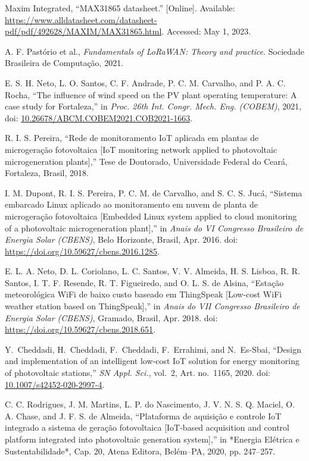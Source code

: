\documentclass{ieeeaccess}
\begin{document}
\begin{thebibliography}{00}
Maxim Integrated, “MAX31865 datasheet.” [Online]. Available: \url{https://www.alldatasheet.com/datasheet-pdf/pdf/492628/MAXIM/MAX31865.html}. Accessed: May 1, 2023.

A. F. Pastório et al., \emph{Fundamentals of LoRaWAN: Theory and practice}. Sociedade Brasileira de Computação, 2021.

E. S. H. Neto, L. O. Santos, C. F. Andrade, P. C. M. Carvalho, and P. A. C. Rocha, “The influence of wind speed on the PV plant operating temperature: A case study for Fortaleza,” in \emph{Proc. 26th Int. Congr. Mech. Eng. (COBEM)}, 2021, doi: \url{10.26678/ABCM.COBEM2021.COB2021-1663}.

R. I. S. Pereira, “Rede de monitoramento IoT aplicada em plantas de microgeração fotovoltaica [IoT monitoring network applied to photovoltaic microgeneration plants],” Tese de Doutorado, Universidade Federal do Ceará, Fortaleza, Brasil, 2018.

I. M. Dupont, R. I. S. Pereira, P. C. M. de Carvalho, and S. C. S. Jucá, “Sistema embarcado Linux aplicado ao monitoramento em nuvem de planta de microgeração fotovoltaica [Embedded Linux system applied to cloud monitoring of a photovoltaic microgeneration plant],” in \emph{Anais do VI Congresso Brasileiro de Energia Solar (CBENS)}, Belo Horizonte, Brasil, Apr. 2016. doi: \url{https://doi.org/10.59627/cbens.2016.1285}.

E. L. A. Neto, D. L. Coriolano, L. C. Santos, V. V. Almeida, H. S. Lisboa, R. R. Santos, I. T. F. Resende, R. T. Figueiredo, and O. L. S. de Alsina, “Estação meteorológica WiFi de baixo custo baseado em ThingSpeak [Low-cost WiFi weather station based on ThingSpeak],” in \emph{Anais do VII Congresso Brasileiro de Energia Solar (CBENS)}, Gramado, Brasil, Apr. 2018. doi: \url{https://doi.org/10.59627/cbens.2018.651}.

Y. Cheddadi, H. Cheddadi, F. Cheddadi, F. Errahimi, and N. Es‑Sbai,
“Design and implementation of an intelligent low‑cost IoT solution for energy monitoring of photovoltaic stations,”
\emph{SN Appl. Sci.}, vol. 2, Art. no. 1165, 2020. doi: \url{10.1007/s42452-020-2997-4}.


C. C. Rodrigues, J. M. Martins, L. P. do Nascimento, J. V. N. S. Q. Maciel, O. A. Chase, and J. F. S. de Almeida, 
“Plataforma de aquisição e controle IoT integrado a sistema de geração fotovoltaica [IoT-based acquisition and control platform integrated into photovoltaic generation system],” 
in *Energia Elétrica e Sustentabilidade*, Cap. 20, Atena Editora, Belém–PA, 2020, pp. 247–257.


\end{thebibliography}
\end{document}
